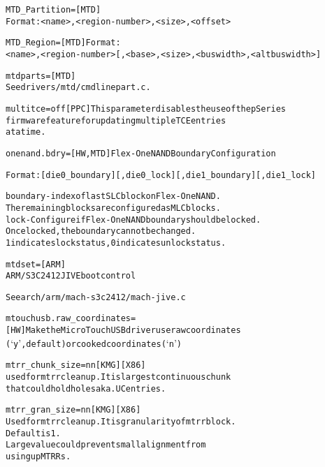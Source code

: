 \documentclass[a4paper,8pt,english]{sphinxmanual}
\begin{document}
\begin{alltt}
        MTD\_Partition=  {[}MTD{]}
                        Format: \textless{}name\textgreater{},\textless{}region-number\textgreater{},\textless{}size\textgreater{},\textless{}offset\textgreater{}

        MTD\_Region=     {[}MTD{]} Format:
                        \textless{}name\textgreater{},\textless{}region-number\textgreater{}{[},\textless{}base\textgreater{},\textless{}size\textgreater{},\textless{}buswidth\textgreater{},\textless{}altbuswidth\textgreater{}{]}

        mtdparts=       {[}MTD{]}
                        See drivers/mtd/cmdlinepart.c.

        multitce=off    {[}PPC{]}  This parameter disables the use of the pSeries
                        firmware feature for updating multiple TCE entries
                        at a time.

        onenand.bdry=   {[}HW,MTD{]} Flex-OneNAND Boundary Configuration

                        Format: {[}die0\_boundary{]}{[},die0\_lock{]}{[},die1\_boundary{]}{[},die1\_lock{]}

                        boundary - index of last SLC block on Flex-OneNAND.
                                   The remaining blocks are configured as MLC blocks.
                        lock     - Configure if Flex-OneNAND boundary should be locked.
                                   Once locked, the boundary cannot be changed.
                                   1 indicates lock status, 0 indicates unlock status.

        mtdset=         {[}ARM{]}
                        ARM/S3C2412 JIVE boot control

                        See arch/arm/mach-s3c2412/mach-jive.c

        mtouchusb.raw\_coordinates=
                        {[}HW{]} Make the MicroTouch USB driver use raw coordinates
                        (`y', default) or cooked coordinates (`n')

        mtrr\_chunk\_size=nn{[}KMG{]} {[}X86{]}
                        used for mtrr cleanup. It is largest continuous chunk
                        that could hold holes aka. UC entries.

        mtrr\_gran\_size=nn{[}KMG{]} {[}X86{]}
                        Used for mtrr cleanup. It is granularity of mtrr block.
                        Default is 1.
                        Large value could prevent small alignment from
                        using up MTRRs.


\end{alltt}
\end{document}
